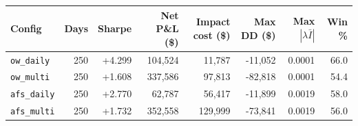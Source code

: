 \begin{tabular}{lrrrrrrr}
\toprule
Config & Days & Sharpe & Net P\&L (\$) & Impact cost (\$) & Max DD (\$) & Max $|\lambda\bar I|$ & Win \% \\
\midrule
\texttt{ow\_daily} & 250 & +4.299 & 104,524 & 11,787 & -11,052 & 0.0001 & 66.0 \\
\texttt{ow\_multi} & 250 & +1.608 & 337,586 & 97,813 & -82,818 & 0.0001 & 54.4 \\
\texttt{afs\_daily} & 250 & +2.770 & 62,787 & 56,417 & -11,899 & 0.0019 & 58.0 \\
\texttt{afs\_multi} & 250 & +1.732 & 352,558 & 129,999 & -73,841 & 0.0019 & 56.0 \\
\bottomrule
\end{tabular}